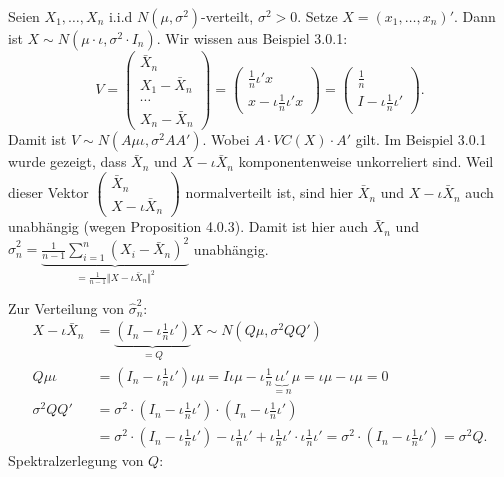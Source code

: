 \documentclass[10pt]{article}
\newcommand{\FZV}{X_1, \ldots, X_n} %
\newcommand{\sni}{\sum_{i=1}^{n}} %
\newenvironment{BSP}[1][]
{\begin{Beispiel}[frametitle=#1]}{\end{Beispiel}}
\begin{document}
			\begin{BSP}[Beispiel 4.0.2 (Mittelwertschätzer)]
				Seien $\FZV$ i.i.d $N(\mu, \sigma^2)$-verteilt, $\sigma^2 >0$. Setze $X=(x_1,\ldots,x_n)'$. Dann ist $X \sim N(\mu \cdot \iota, \sigma^2 \cdot I_n)$. Wir wissen aus Beispiel 3.0.1:
				\begin{equation*}
					V = \left(
					\begin{array}{c}
						\bar{X}_n\\
						X_1 - \bar{X}_n\\
						\cdots\\
						X_n - \bar{X}_n
					\end{array}
					\right) = \left(
					\begin{array}{c}
						\frac{1}{n} \iota' x\\
						x-\iota \frac{1}{n} \iota' x
					\end{array}
					\right) = 
					\left(
					\begin{array}{c}
					    \frac{1}{n}\\
						I - \iota \frac{1}{n} \iota'
					\end{array}
					\right).
				\end{equation*}
				Damit ist $V \sim N(A\mu \iota, \sigma^2 AA')$. Wobei $A \cdot VC(X) \cdot A'$ gilt. 
				Im Beispiel 3.0.1 wurde gezeigt, dass $\bar{X}_n$ und $X-\iota\bar{X}_n$ komponentenweise unkorreliert sind. Weil dieser Vektor $\left(
				\begin{array}{c}
					\bar{X}_n\\
					X-\iota \bar{X}_n
				\end{array}
				\right)$ normalverteilt ist, sind hier $\bar{X}_n$ und $X-\iota\bar{X}_n$ auch unabhängig (wegen Proposition 4.0.3). Damit ist hier auch $\bar{X}_n$ und $\hat{\sigma}^2_n = \underbrace{\frac{1}{n-1} \sni (X_i - \bar{X}_n)^2}_{= \frac{1}{n-1} \Vert X - \iota \bar{X}_n \Vert ^2}$ unabhängig. 
				
				Zur Verteilung von $\hat{\sigma}^2_n$:
				\begin{equation*}
					\begin{split}
						X - \iota \bar{X}_n &= \underbrace{\left(I_n - \iota \frac{1}{n} \iota'\right)}_{=Q} X \sim N(Q\mu, \sigma^2 QQ')\\
						Q \mu \iota &= \left( I_n - \iota \frac{1}{n} \iota'\right)\iota\mu = I \iota \mu - \iota \frac{1}{n} \underbrace{\iota \iota'}_{=n}\mu = \iota \mu - \iota \mu =0\\
						\sigma^2 QQ' &= \sigma^2 \cdot \left(I_n - \iota \frac{1}{n}\iota'\right) \cdot \left(I_n - \iota \frac{1}{n}\iota'\right)\\
						&=  \sigma^2 \cdot \left(I_n - \iota \frac{1}{n}\iota'\right) - \iota \frac{1}{n} \iota' + \iota \frac{1}{n} \iota' \cdot \iota \frac{1}{n} \iota' = \sigma^2 \cdot \left(I_n - \iota \frac{1}{n}\iota'\right) = \sigma^2Q.
					\end{split}
				\end{equation*}
				Spektralzerlegung von $Q$:
				

\end{BSP}
\end{document}
